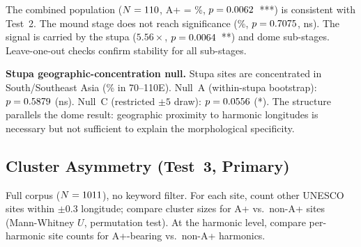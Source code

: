 \documentclass[12pt,a4paper]{article}
\begin{document}
\noindent The combined population ($N = 110$, A+ = \evoApRate\%,
$p = 0.0062$~***) is consistent with Test~2. The mound stage does not reach
significance (\evoMoundApRate\%, $p = 0.7075$, ns). The signal is carried
by the stupa ($5.56\times$, $p = 0.0064$~**) and dome sub-stages.
Leave-one-out checks confirm stability for all sub-stages.

\textbf{Stupa geographic-concentration null.}
\label{sec:stupa_geo_null}
Stupa sites are concentrated in South/Southeast Asia
(\stupaHeartlandFrac\% in 70\textdegree--110\textdegree{}E).
Null~A (within-stupa bootstrap): $p = 0.5879$ (ns).
Null~C (restricted $\pm 5$\textdegree{} draw): $p = 0.0556$ (*).
The structure parallels the dome result: geographic proximity to harmonic
longitudes is necessary but not sufficient to explain the morphological
specificity.

\subsection{Cluster Asymmetry (Test~3, Primary)}
\label{sec:resultscluster}

Full corpus ($N = \NclusterTotal$), no keyword filter.
For each site, count other UNESCO sites within $\pm 0.3$\textdegree{}
longitude; compare cluster sizes for A+ vs.\ non-A+ sites (Mann-Whitney $U$,
permutation test). At the harmonic level, compare per-harmonic site counts
for A+-bearing vs.\ non-A+ harmonics.

\begin{table}[H]
\centering
\caption{Cluster asymmetry: A+ vs.\ non-A+ sites in the full UNESCO corpus
  ($N = \NclusterTotal$; cluster radius $\pm 0.3$\textdegree{} lon)}
\label{tab:clusterasym}
\small
{}%
\end{table}
\end{document}
